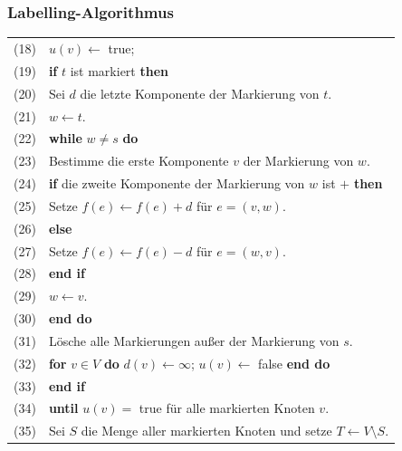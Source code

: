 \documentclass[smaller]{beamer}
\begin{document}
\begin{frame}
\frametitle{Labelling-Algorithmus}
\begin{tabular}{rl}
(18)& \qquad $u(v) \leftarrow$ true; \\
(19)& \qquad \textbf{if} $t$ ist markiert \textbf{then} \\
(20)& \qquad\qquad Sei $d$ die letzte Komponente der Markierung von $t$. \\
(21)& \qquad\qquad $w \leftarrow t$. \\
(22)& \qquad\qquad \textbf{while} $w \neq s$ \textbf{do} \\
(23)& \qquad\qquad\qquad Bestimme die erste Komponente $v$ der Markierung von $w$. \\
(24)& \qquad\qquad\qquad \textbf{if} die zweite Komponente der Markierung von $w$ ist $+$ \textbf{then} \\
(25)& \qquad\qquad\qquad\qquad Setze $f(e) \leftarrow f(e) + d$ für $e=(v,w)$. \\
(26)& \qquad\qquad\qquad \textbf{else} \\
(27)& \qquad\qquad\qquad\qquad Setze $f(e) \leftarrow f(e) - d$ für $e=(w,v)$. \\
(28)& \qquad\qquad\qquad \textbf{end if} \\
(29)& \qquad\qquad\qquad $w \leftarrow v$. \\
(30)& \qquad\qquad \textbf{end do} \\
(31)& \qquad\qquad Lösche alle Markierungen außer der Markierung von $s$. \\
(32)& \qquad\qquad \textbf{for} $v \in V$ \textbf{do} $d(v) \leftarrow \infty$; $u(v) \leftarrow$ false \textbf{end do} \\
(33)& \qquad \textbf{end if} \\
(34)& \textbf{until} $u(v) =$ true für alle markierten Knoten $v$. \\
(35)& Sei $S$ die Menge aller markierten Knoten und setze $T \leftarrow V \setminus S$.
\end{tabular}
\end{frame}
\end{document}
